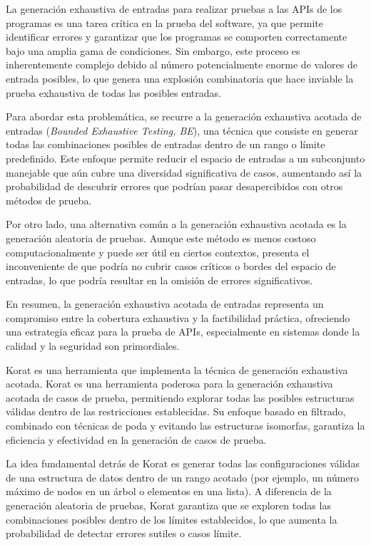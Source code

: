 La generación exhaustiva de entradas para realizar pruebas a las APIs de los programas es una tarea crítica en la prueba del software, ya que permite identificar errores y garantizar que los programas se comporten correctamente bajo una amplia gama de condiciones. Sin embargo, este proceso es inherentemente complejo debido al número potencialmente enorme de valores de entrada posibles, lo que genera una explosión combinatoria que hace inviable la prueba exhaustiva de todas las posibles entradas.

Para abordar esta problemática, se recurre a la generación exhaustiva acotada de entradas (\emph{Bounded Exhaustive Testing, BE}), una técnica que consiste en generar todas las combinaciones posibles de entradas dentro de un rango o límite predefinido. Este enfoque permite reducir el espacio de entradas a un subconjunto manejable que aún cubre una diversidad significativa de casos, aumentando así la probabilidad de descubrir errores que podrían pasar desapercibidos con otros métodos de prueba.

Por otro lado, una alternativa común a la generación exhaustiva acotada es la generación aleatoria de pruebas. Aunque este método es menos costoso computacionalmente y puede ser útil en ciertos contextos, presenta el inconveniente de que podría no cubrir casos críticos o bordes del espacio de entradas, lo que podría resultar en la omisión de errores significativos.

En resumen, la generación exhaustiva acotada de entradas representa un compromiso entre la cobertura exhaustiva y la factibilidad práctica, ofreciendo una estrategia eficaz para la prueba de APIs, especialmente en sistemas donde la calidad y la seguridad son primordiales.

Korat es una herramienta que implementa la técnica de generación exhaustiva acotada. Korat es una herramienta poderosa para la generación exhaustiva acotada de casos de prueba, permitiendo explorar todas las posibles estructuras válidas dentro de las restricciones establecidas. Su enfoque basado en filtrado, combinado con técnicas de poda y evitando las estructuras isomorfas, garantiza la eficiencia y efectividad en la generación de casos de prueba.

La idea fundamental detrás de Korat es generar todas las configuraciones válidas de una estructura de datos dentro de un rango acotado (por ejemplo, un número máximo de nodos en un árbol o elementos en una lista). A diferencia de la generación aleatoria de pruebas, Korat garantiza que se exploren todas las combinaciones posibles dentro de los límites establecidos, lo que aumenta la probabilidad de detectar errores sutiles o casos límite.

